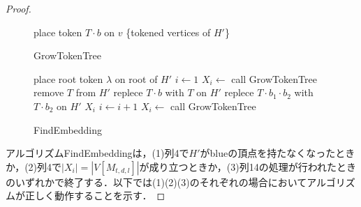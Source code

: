 \documentclass[master]{kuisthesis}		%
\theoremstyle{plain}
\theoremstyle{definition}
\begin{document}
\begin{proof}
\begin{figure}[!t]
\begin{algorithm}[H]
	\caption{GrowTokenTree}
	\label{growtokentree}
	\begin{algorithmic}[1]
    \STATE place token $T \cdot b$ on $v$
    \ENDWHILE
    \RETURN \{tokened vertices of $H'$\}
	\end{algorithmic}
\end{algorithm}
\end{figure}



\begin{figure}[!t]
\begin{algorithm}[H]
    \caption{FindEmbedding}
	\label{findembedding}
	\begin{algorithmic}[1]
    \STATE place root token $\lambda$ on root of $H'$
    \STATE $i \leftarrow 1$
    \STATE $X_i  \leftarrow$ call GrowTokenTree
    \STATE remove $T$ from $H'$
    \STATE replece $T \cdot b$ with $T$ on $H'$
    \ENDIF
    \STATE replece $T \cdot b_1 \cdot b_2$ with $T \cdot b_2$ on $H'$
    \ENDWHILE
    \ELSE
    \RETURN $X_i$
    \ENDIF
    \STATE $i \leftarrow i+1$
    \STATE $X_i \leftarrow$ call GrowTokenTree
    \ENDWHILE
	\end{algorithmic}
\end{algorithm}
\end{figure}


アルゴリズムFindEmbeddingは，(1)列4で$H'$がblueの頂点を持たなくなったときか，(2)列4で$|X_i| = |V[M_{t, d, l}]|$が成り立つときか，(3)列14の処理が行われたときのいずれかで終了する．以下では(1)(2)(3)のそれぞれの場合においてアルゴリズムが正しく動作することを示す．


\end{proof}
\end{document}
